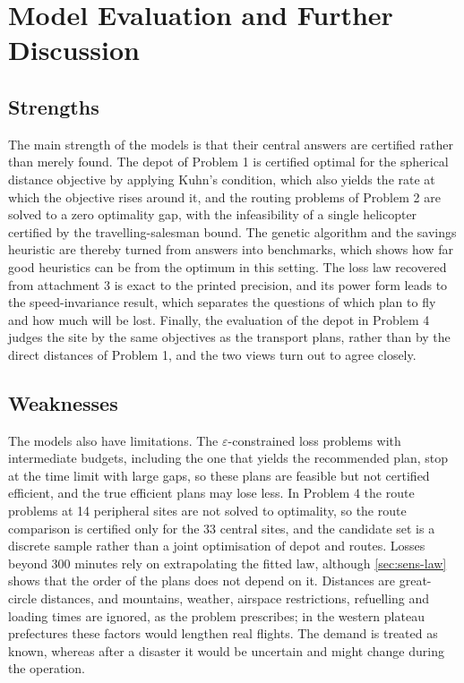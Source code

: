 \documentclass[11pt,a4paper]{article}
\theoremstyle{definition}
\begin{document}
\section{Model Evaluation and Further Discussion}\label{sec:evaluation}

\subsection{Strengths}
The main strength of the models is that their central answers are certified rather than merely found.
The depot of Problem 1 is certified optimal for the spherical distance objective by applying Kuhn's condition, which also yields the rate at which the objective rises around it, and the routing problems of Problem 2 are solved to a zero optimality gap, with the infeasibility of a single helicopter certified by the travelling-salesman bound.
The genetic algorithm and the savings heuristic are thereby turned from answers into benchmarks, which shows how far good heuristics can be from the optimum in this setting.
The loss law recovered from attachment 3 is exact to the printed precision, and its power form leads to the speed-invariance result, which separates the questions of which plan to fly and how much will be lost.
Finally, the evaluation of the depot in Problem 4 judges the site by the same objectives as the transport plans, rather than by the direct distances of Problem 1, and the two views turn out to agree closely.

\subsection{Weaknesses}
The models also have limitations.
The $\varepsilon$-constrained loss problems with intermediate budgets, including the one that yields the recommended plan, stop at the time limit with large gaps, so these plans are feasible but not certified efficient, and the true efficient plans may lose less.
In Problem 4 the route problems at 14 peripheral sites are not solved to optimality, so the route comparison is certified only for the 33 central sites, and the candidate set is a discrete sample rather than a joint optimisation of depot and routes.
Losses beyond 300 minutes rely on extrapolating the fitted law, although \cref{sec:sens-law} shows that the order of the plans does not depend on it.
Distances are great-circle distances, and mountains, weather, airspace restrictions, refuelling and loading times are ignored, as the problem prescribes; in the western plateau prefectures these factors would lengthen real flights.
The demand is treated as known, whereas after a disaster it would be uncertain and might change during the operation.
\end{document}
